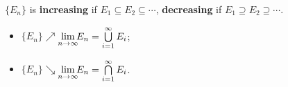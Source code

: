  \(\{E_n\}\) is
\textbf{increasing} if \(E_1 \subseteq E_2 \subseteq \cdots\),
\textbf{decreasing} if \(E_1 \supseteq E_2 \supseteq \cdots\).
\begin{multicols}{2}
\begin{itemize}
  \item \(\{E_n\} \nearrow\) \tf \(\lim\limits_{\mathclap{n\rightarrow \infty}}E_n =
    \bigcup\limits_{i=1}^{\infty}E_i\);
  \item \(\{E_n\} \searrow\) \tf \(\lim\limits_{\mathclap{n\rightarrow \infty}}E_n =
    \bigcap\limits_{i=1}^{\infty}E_i\).
\end{itemize}
\end{multicols}


